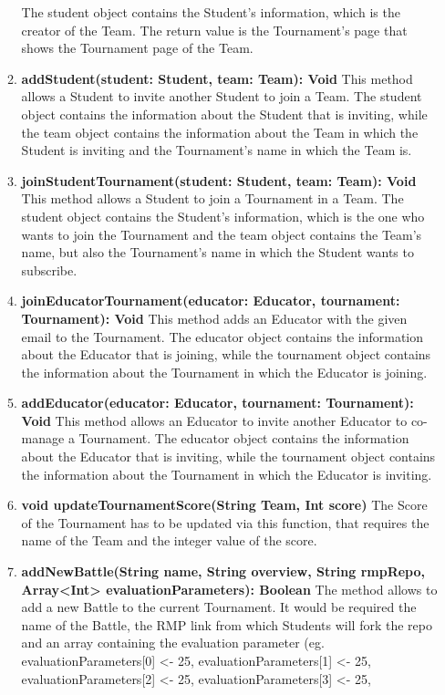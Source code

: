 \begin{enumerate}
\begin{enumerate}[label=$\bullet$]
            The student object contains the Student's information, which is the creator of the Team. The return value is the Tournament's page that shows the Tournament page of the Team.
            \item \textbf{addStudent(student: Student, team: Team): Void} This method allows a Student to invite another Student to join a Team. The student object contains the information about the Student that is inviting, while the team
            object contains the information about the Team in which the Student is inviting and the Tournament's name in which the Team is.
            \item \textbf{joinStudentTournament(student: Student, team: Team): Void} This method allows a Student to join a Tournament in a Team. The student object contains the Student's information, which is the one who wants to join 
            the Tournament and the team object contains the Team's name, but also the Tournament's name in which the Student wants to subscribe.
            \item \textbf{joinEducatorTournament(educator: Educator, tournament: Tournament): Void} This method adds an Educator with the given email to the Tournament. The educator object contains the information about the Educator
            that is joining, while the tournament object contains the information about the Tournament in which the Educator is joining.
            \item \textbf{addEducator(educator: Educator, tournament: Tournament): Void} This method allows an Educator to invite another Educator to co-manage a Tournament. The educator object contains the information about the Educator
            that is inviting, while the tournament object contains the information about the Tournament in which the Educator is inviting.
            \item \textbf{void updateTournamentScore(String Team, Int score)} The Score of the Tournament has to be updated via this function, that requires the name of the Team and the integer value of the score.
            \item \textbf{addNewBattle(String name, String overview, String rmpRepo, Array<Int> evaluationParameters): Boolean} The method allows to add a new Battle to the current Tournament. It would be required the name of the Battle, 
            the RMP link from which Students will fork the repo and an array containing the evaluation parameter (eg. evaluationParameters[0] <- 25, evaluationParameters[1] <- 25, evaluationParameters[2] <- 25, evaluationParameters[3] <- 25,

\end{enumerate}
\end{enumerate}
